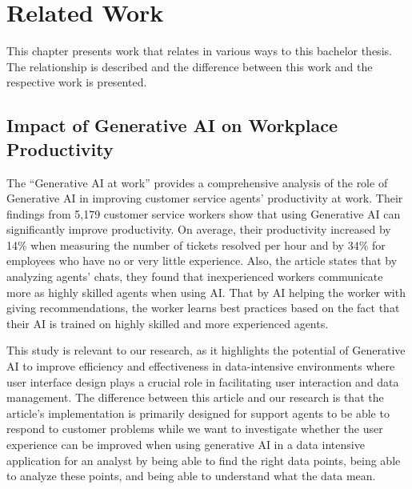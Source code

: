 \chapter{Related Work}
\label{chp:relatedwork}

\begin{comment}
   - Skirva att "Enhancing User Experience Journey: Simplifying Digital Interactions with Generative AI Integration" \cite{resGateGenAI} gör liknande sak men ser inget om att de har studerat om det faktiskt funkar utan mer tagit upp en ide ba. Sen kanske ta med Generative AI at Work \cite{generativAIAtWork} för de har ju använt ai i sitt arbete.
 
\end{comment}

This chapter presents work that relates in various ways to this bachelor thesis. The relationship is described and the difference between this work and the respective work is presented.

\section{Impact of Generative AI on Workplace Productivity}
The “Generative AI at work” \cite{generativAIAtWork} provides a comprehensive analysis of the role of Generative AI in improving customer service agents' productivity at work. Their findings from 5,179 customer service workers show that using Generative AI can significantly improve productivity. On average, their productivity increased by 14\% when measuring the number of tickets resolved per hour and by 34\% for employees who have no or very little experience. Also, the article states that by analyzing agents' chats, they found that inexperienced workers communicate more as highly skilled agents when using AI. That by AI helping the worker with giving recommendations, the worker learns best practices based on the fact that their AI is trained on highly skilled and more experienced agents.

This study is relevant to our research, as it highlights the potential of Generative AI to improve efficiency and effectiveness in data-intensive environments where user interface design plays a crucial role in facilitating user interaction and data management. The difference between this article and our research is that the article's implementation is primarily designed for support agents to be able to respond to customer problems while we want to investigate whether the user experience can be improved when using generative AI in a data intensive application for an analyst by being able to find the right data points, being able to analyze these points, and being able to understand what the data mean.

